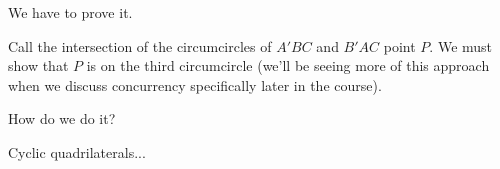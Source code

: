 


We have to prove it.


Call the intersection of the circumcircles of $A'BC$ and $B'AC$ point $P.$ We must show that $P$ is on the third circumcircle (we'll be seeing more of this approach when we discuss concurrency specifically later in the course).

How do we do it?


Cyclic quadrilaterals...











